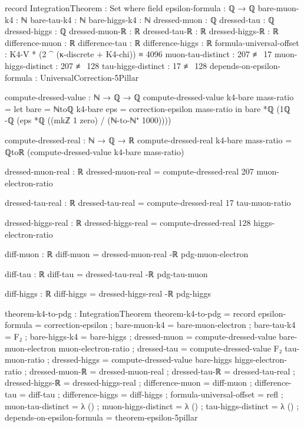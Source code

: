 \documentclass[11pt,a4paper]{book}
\begin{document}
\begin{code}
record IntegrationTheorem : Set where
  field
    epsilon-formula : ℚ → ℚ
    bare-muon-k4 : ℕ
    bare-tau-k4 : ℕ  
    bare-higgs-k4 : ℕ
    dressed-muon : ℚ
    dressed-tau : ℚ
    dressed-higgs : ℚ
    dressed-muon-ℝ : ℝ
    dressed-tau-ℝ : ℝ
    dressed-higgs-ℝ : ℝ
    difference-muon : ℝ
    difference-tau : ℝ
    difference-higgs : ℝ
    formula-universal-offset : K4-V * (2 ^ (κ-discrete + K4-chi)) ≡ 4096
    muon-tau-distinct : 207 ≢ 17
    muon-higgs-distinct : 207 ≢ 128
    tau-higgs-distinct : 17 ≢ 128
    depends-on-epsilon-formula : UniversalCorrection-5Pillar

compute-dressed-value : ℕ → ℚ → ℚ
compute-dressed-value k4-bare mass-ratio = 
  let bare = ℕtoℚ k4-bare
      eps = correction-epsilon mass-ratio
  in bare *ℚ (1ℚ -ℚ (eps *ℚ ((mkℤ 1 zero) / (ℕ-to-ℕ⁺ 1000))))

compute-dressed-real : ℕ → ℚ → ℝ
compute-dressed-real k4-bare mass-ratio = ℚtoℝ (compute-dressed-value k4-bare mass-ratio)

dressed-muon-real : ℝ
dressed-muon-real = compute-dressed-real 207 muon-electron-ratio

dressed-tau-real : ℝ
dressed-tau-real = compute-dressed-real 17 tau-muon-ratio

dressed-higgs-real : ℝ
dressed-higgs-real = compute-dressed-real 128 higgs-electron-ratio

diff-muon : ℝ
diff-muon = dressed-muon-real -ℝ pdg-muon-electron

diff-tau : ℝ
diff-tau = dressed-tau-real -ℝ pdg-tau-muon

diff-higgs : ℝ
diff-higgs = dressed-higgs-real -ℝ pdg-higgs

theorem-k4-to-pdg : IntegrationTheorem
theorem-k4-to-pdg = record
  { epsilon-formula = correction-epsilon
  ; bare-muon-k4 = bare-muon-electron
  ; bare-tau-k4 = F₂
  ; bare-higgs-k4 = bare-higgs
  ; dressed-muon = compute-dressed-value bare-muon-electron muon-electron-ratio
  ; dressed-tau = compute-dressed-value F₂ tau-muon-ratio
  ; dressed-higgs = compute-dressed-value bare-higgs higgs-electron-ratio
  ; dressed-muon-ℝ = dressed-muon-real
  ; dressed-tau-ℝ = dressed-tau-real
  ; dressed-higgs-ℝ = dressed-higgs-real
  ; difference-muon = diff-muon
  ; difference-tau = diff-tau
  ; difference-higgs = diff-higgs
  ; formula-universal-offset = refl
  ; muon-tau-distinct = λ ()
  ; muon-higgs-distinct = λ ()
  ; tau-higgs-distinct = λ ()
  ; depends-on-epsilon-formula = theorem-epsilon-5pillar
  }
\end{code}
\end{document}
